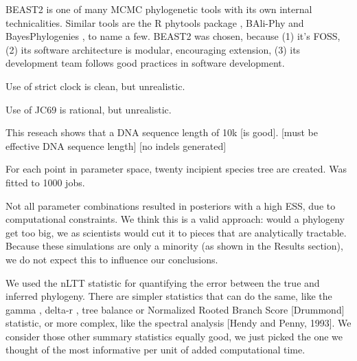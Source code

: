 
BEAST2 is one of many MCMC phylogenetic tools with its
own internal technicalities. Similar tools are the R phytools
package \cite{phytools}, BAli-Phy \cite{suchard2006bali}
and BayesPhylogenies \cite{pagel2007bayesphylogenies}, to name a few.
BEAST2 was chosen, because (1) it's FOSS, (2) its software
architecture is modular, encouraging extension, (3) its development
team follows good practices in software development.




Use of strict clock is clean, but unrealistic.



Use of JC69 is rational, but unrealistic.



This reseach shows that a DNA sequence length of 10k [is good].
[must be effective DNA sequence length]
[no indels generated]



For each point in parameter space, twenty incipient species tree are created.
Was fitted to 1000 jobs.


Not all parameter combinations resulted in posteriors with a high ESS,
due to computational constraints. We think this is a valid approach:
would a phylogeny get too big, we as scientists would cut it to
pieces that are analytically tractable. Because these simulations
are only a minority (as shown in the Results section), we do not
expect this to influence our conclusions.


We used the nLTT statistic for quantifying the error between the
true and inferred phylogeny. There are simpler statistics that
can do the same, like the gamma \cite{pagel1999inferring}, 
delta-r \cite{pigot2010shape} , 
tree balance  or
Normalized Rooted Branch Score [Drummond] statistic, 
or more complex, like the spectral analysis [Hendy and Penny, 1993].
We consider those other summary statistics equally good, we just picked the
one we thought of the most informative per unit of added computational time.

%
